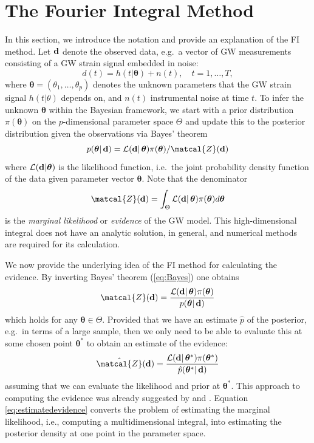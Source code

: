 \documentclass[%
 reprint,
 amsmath,amssymb,
 aps,
]{revtex4-2}
\def\btheta{\boldsymbol{\theta}}
\def\btheta{\boldsymbol{\theta}}
\renewcommand{\d}{{\bf d}}
\newcommand{\btheta}{\mbox{\boldmath $\theta$}}
\begin{document}

\section{\label{sec:FI derivation} The Fourier Integral Method}
%




In this section, we introduce the notation and provide an explanation of the FI method. Let $\d$ denote the observed data, e.g.\ a vector of GW measurements consisting of a GW strain signal embedded in noise:
\[d(t)=h(t|\btheta) + n(t),\quad t=1,\ldots,T, \]
where $\btheta=(\theta_1,\ldots,\theta_p)$ denotes the unknown parameters  that the GW strain signal $h(t|\theta)$ depends on, and $n(t)$ instrumental noise at time $t$.
To infer the unknown $\btheta$ within the Bayesian framework, we start with a prior distribution $\pi(\btheta)$ on the $p$-dimensional parameter space $\Theta$ and update this to the posterior distribution given the observations via Bayes' theorem
\begin{equation}\label{eq:Bayes}
  p(\btheta|\,\d)=\mathcal{L}(\d|\,\btheta) \pi(\btheta) / \matcal{Z}(\d) 
 \end{equation}
where $\mathcal{L}(\d|\btheta)$ is the likelihood function, i.e.\ the joint probability density function of the data given parameter vector $\btheta$. Note that the denominator \[\matcal{Z}(\d)=\int_{\Theta} \mathcal{L}(\d|\,\btheta) \pi(\btheta) d\btheta\]
is the {\em marginal likelihood} or {\em evidence} of the GW model. This high-dimensional integral does not have an analytic
solution, in general, and numerical methods are required
for its calculation.

We now provide the underlying  idea of the FI method for calculating the evidence. By inverting Bayes' theorem (\ref{eq:Bayes}) one obtains
\begin{equation} \label{eq:invertedBayes}  
 \matcal{Z}(\d) = \frac{\mathcal{L}(\d|\,\btheta) \pi(\btheta)}{p(\btheta|\,\d)}
 \end{equation}
which holds for any $\btheta\in \Theta$.
Provided that we have an estimate $\hat{p}$ of the posterior, e.g.\ in terms of a large sample, then we only need to be able to evaluate this at some chosen point $\btheta^*$ to obtain an estimate of the evidence:
\begin{equation}\label{eq:estimatedevidence}
\hat{\matcal{Z}}(\d) =  \frac{\mathcal{L}(\d|\,\btheta^*) \pi(\btheta^*)}{\hat{p}(\btheta^*|\,\d)}
\end{equation}
assuming that we can evaluate the likelihood and prior at $\btheta^*$.
This approach to computing the evidence was already suggested by \cite{chib1995marginal} and \cite{chib2001marginal}. Equation \eqref{eq:estimatedevidence} converts the problem of estimating the marginal likelihood, i.e., computing a multidimensional integral, into estimating the posterior density at one point in the parameter space. 
\end{document}
